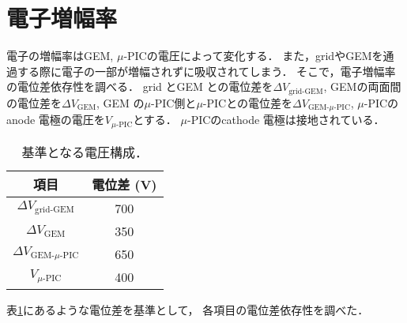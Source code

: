 \documentclass[../master]{subfiles}
\begin{document}
\section{電子増幅率}
電子の増幅率はGEM, $\mu$-PICの電圧によって変化する．
また，gridやGEMを通過する際に電子の一部が増幅されずに吸収されてしまう．
そこで，電子増幅率の電位差依存性を調べる．
grid とGEM との電位差を$\Delta V_{\text{grid-GEM}}$, GEMの両面間の電位差を$\Delta V_{\text{GEM}}$,
GEM の$\mu$-PIC側と$\mu$-PICとの電位差を$\Delta V_{\text{GEM-}\mu\text{-PIC}}$,
$\mu$-PICのanode 電極の電圧を$V_{\mu\text{-PIC}}$とする．
$\mu$-PICのcathode 電極は接地されている．
\begin{table}
  \centering
  \caption{基準となる電圧構成．}
  \label{tab::voltage_configuration}
%  
  \begin{tabular}{cc}
    \toprule
    項目 & 電位差 (\si{\volt}) \\
    \midrule
    $\Delta V_{\text{grid-GEM}}$ & 700 \\
    $\Delta V_{\text{GEM}}$ & 350 \\
    $\Delta V_{\text{GEM-}\mu\text{-PIC}}$ & 650 \\
    $V_{\mu\text{-PIC}}$ & 400 \\
    \bottomrule
  \end{tabular}
\end{table}
表\ref{tab::voltage_configuration}にあるような電位差を基準として，
各項目の電位差依存性を調べた．

\end{document}

